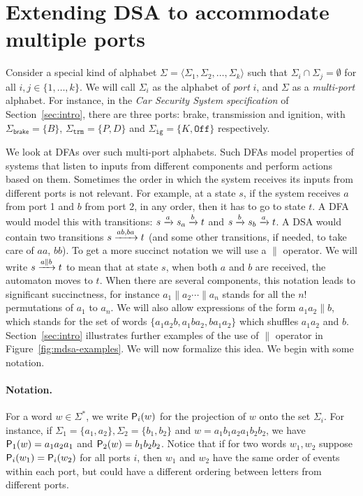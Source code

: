 \section{Extending DSA to accommodate multiple ports}
\label{sec:multiport}

Consider a special kind of alphabet
$\Sigma = \langle \Sigma_1, \Sigma_2, \dots, \Sigma_k \rangle$ such
that $\Sigma_i \cap \Sigma_j = \emptyset$ for all $i, j \in
\{1, \dots, k\}$. We will call $\Sigma_i$ as the alphabet of \emph{port} $i$,
and $\Sigma$ as a \emph{multi-port} alphabet. For instance, in the \emph{Car Security System specification} of Section~\ref{sec:intro}, there are three ports: brake, transmission and ignition, with $\Sigma_{\mathsf{brake}} = \{B\}$, $\Sigma_{\mathtt{trm}} = \{ P, D\}$ and $\Sigma_{\mathtt{ig}} = \{ K, \mathtt{Off} \}$ respectively.  

We look at DFAs over such multi-port alphabets. Such DFAs model properties of systems 
that listen to inputs from different components and perform actions
based on them. Sometimes the order in which the system receives its
inputs from different ports is not relevant. For example, at a state
$s$, if the system receives $a$ from port 1 and $b$ from port 2, in any
order, then it has to go to state $t$.  A DFA would model this with
transitions: $s \xrightarrow{a} s_a \xrightarrow{b} t$ and $s \xrightarrow{b} s_b \xrightarrow{a}
t$. A DSA would contain two transitions $s \xrightarrow{ab, ba} t$ (and some
other transitions, if needed, to take care of $aa$, $bb$). To get a
more succinct notation we will use a $\parallel$ operator. We will
write $s \xrightarrow{a \parallel b} t$ to mean that at state $s$, when
both $a$ and $b$ are received, the automaton moves to $t$. When there
are several components, this notation leads to significant
succinctness, for instance $a_1 \parallel a_2 \cdots \parallel a_n$
stands for all the $n!$ permutations of $a_1$ to $a_n$. We will also
allow expressions of the form $a_1 a_2 \parallel b$, which stands for
the set of words $\{a_1 a_2 b, a_1 b a_2, b a_1 a_2\}$ which shuffles
$a_1a_2$ and $b$. Section~\ref{sec:intro} illustrates further examples of the use of $\parallel$ operator in Figure~\ref{fig:mdsa-examples}. We will now formalize this idea.  We begin with some notation.%

\paragraph*{Notation.} For a word $w \in \Sigma^*$, we write
$\mathsf{P}_{i}(w)$ for the projection of $w$ onto the set $\Sigma_i$. For
instance, if $\Sigma_1 = \{a_1, a_2\}, \Sigma_2 = \{b_1, b_2\}$ and
$w = a_1 b_1 a_2 a_1 b_2 b_2$, we have $\mathsf{P}_{1}(w) = a_1 a_2 a_1$ and
$\mathsf{P}_{2}(w) = b_1 b_2 b_2$.  
Notice that if for two words $w_1, w_2$ suppose $\mathsf{P}_{i}(w_1) = \mathsf{P}_{i}(w_2)$ for all ports $i$, then $w_1$ and $w_2$ have the same order of events within each port, but could have a different ordering between letters from different ports.%


